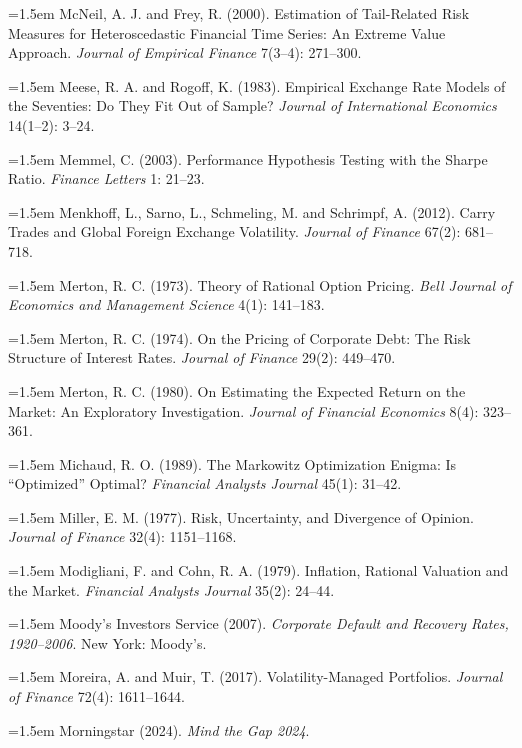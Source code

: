 \hangindent=1.5em McNeil, A. J. and Frey, R. (2000). Estimation of Tail-Related Risk Measures for Heteroscedastic Financial Time Series: An Extreme Value Approach. \emph{Journal of Empirical Finance} 7(3--4): 271--300.

\hangindent=1.5em Meese, R. A. and Rogoff, K. (1983). Empirical Exchange Rate Models of the Seventies: Do They Fit Out of Sample? \emph{Journal of International Economics} 14(1--2): 3--24.

\hangindent=1.5em Memmel, C. (2003). Performance Hypothesis Testing with the Sharpe Ratio. \emph{Finance Letters} 1: 21--23.

\hangindent=1.5em Menkhoff, L., Sarno, L., Schmeling, M. and Schrimpf, A. (2012). Carry Trades and Global Foreign Exchange Volatility. \emph{Journal of Finance} 67(2): 681--718.

\hangindent=1.5em Merton, R. C. (1973). Theory of Rational Option Pricing. \emph{Bell Journal of Economics and Management Science} 4(1): 141--183.

\hangindent=1.5em Merton, R. C. (1974). On the Pricing of Corporate Debt: The Risk Structure of Interest Rates. \emph{Journal of Finance} 29(2): 449--470.

\hangindent=1.5em Merton, R. C. (1980). On Estimating the Expected Return on the Market: An Exploratory Investigation. \emph{Journal of Financial Economics} 8(4): 323--361.

\hangindent=1.5em Michaud, R. O. (1989). The Markowitz Optimization Enigma: Is ``Optimized'' Optimal? \emph{Financial Analysts Journal} 45(1): 31--42.

\hangindent=1.5em Miller, E. M. (1977). Risk, Uncertainty, and Divergence of Opinion. \emph{Journal of Finance} 32(4): 1151--1168.

\hangindent=1.5em Modigliani, F. and Cohn, R. A. (1979). Inflation, Rational Valuation and the Market. \emph{Financial Analysts Journal} 35(2): 24--44.

\hangindent=1.5em Moody's Investors Service (2007). \emph{Corporate Default and Recovery Rates, 1920--2006}. New York: Moody's.

\hangindent=1.5em Moreira, A. and Muir, T. (2017). Volatility-Managed Portfolios. \emph{Journal of Finance} 72(4): 1611--1644.

\hangindent=1.5em Morningstar (2024). \emph{Mind the Gap 2024}.


